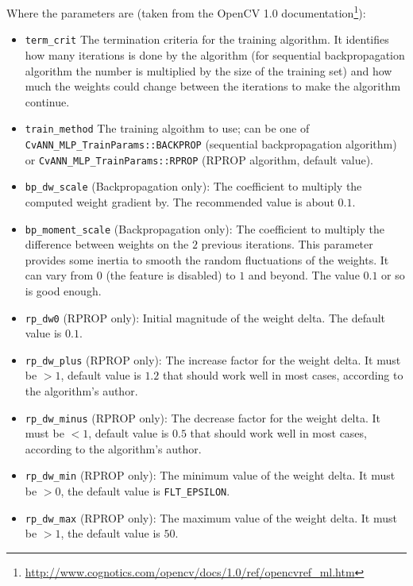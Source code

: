 Where the parameters are (taken from the OpenCV 1.0 documentation\footnote{\url{http://www.cognotics.com/opencv/docs/1.0/ref/opencvref_ml.htm}}):
\begin{itemize}

\item \lstinline|term_crit| The termination criteria for the training algorithm. It identifies how many iterations is done by the algorithm (for sequential backpropagation algorithm the number is multiplied by the size of the training set) and how much the weights could change between the iterations to make the algorithm continue. 

\item \lstinline|train_method| The training algoithm to use; can be one of \lstinline|CvANN_MLP_TrainParams::BACKPROP| (sequential backpropagation algorithm) or \lstinline|CvANN_MLP_TrainParams::RPROP| (RPROP algorithm, default value). 

\item \lstinline|bp_dw_scale|
    (Backpropagation only): The coefficient to multiply the computed weight gradient by. The recommended value is about $0.1$.
\item \lstinline|bp_moment_scale|
    (Backpropagation only): The coefficient to multiply the difference between weights on the $2$ previous iterations. This parameter provides some inertia to smooth the random fluctuations of the weights. It can vary from $0$ (the feature is disabled) to $1$ and beyond. The value $0.1$ or so is good enough.
\item \lstinline|rp_dw0|
    (RPROP only): Initial magnitude of the weight delta. The default value is $0.1$.
\item \lstinline|rp_dw_plus|
    (RPROP only): The increase factor for the weight delta. It must be $>1$, default value is $1.2$ that should work well in most cases, according to the algorithm's author.
\item \lstinline|rp_dw_minus|
    (RPROP only): The decrease factor for the weight delta. It must be $<1$, default value is $0.5$ that should work well in most cases, according to the algorithm's author.
\item \lstinline|rp_dw_min|
    (RPROP only): The minimum value of the weight delta. It must be $>0$, the default value is \lstinline|FLT_EPSILON|. 
\item \lstinline|rp_dw_max|
    (RPROP only): The maximum value of the weight delta. It must be $>1$, the default value is $50$. 
\end{itemize}


